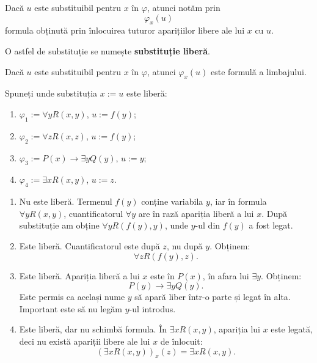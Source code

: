 \begin{definition}
	Dacă \(u\) este substituibil pentru \(x\) în \( \varphi \), atunci notăm prin
	\[
		\varphi_x(u)
	\]
	formula obținută prin înlocuirea tuturor aparițiilor libere ale lui \(x\) cu \(u\).

	O astfel de substituție se numește \textbf{substituție liberă}.
\end{definition}

\begin{prop}
	Dacă \(u\) este substituibil pentru \(x\) în \( \varphi \), atunci \( \varphi_x(u) \) este formulă a limbajului.
\end{prop}

\begin{ex}
	Spuneți unde substituția \(x := u\) este liberă:
	\begin{enumerate}
		\item \( \varphi_1 := \forall y R(x,y) \), \(u := f(y)\);
		\item \( \varphi_2 := \forall z R(x,z) \), \(u := f(y)\);
		\item \( \varphi_3 := P(x) \to \exists y Q(y) \), \(u := y\);
		\item \( \varphi_4 := \exists x R(x,y) \), \(u := z\).
	\end{enumerate}
\end{ex}

\begin{solutie}
	\noindent
	\begin{enumerate}
		\item Nu este liberă. Termenul \(f(y)\) conține variabila \(y\), iar în formula \( \forall y R(x,y) \), cuantificatorul \( \forall y \) are în rază apariția liberă a lui \(x\). După substituție am obține \( \forall y R(f(y),y) \), unde \(y\)-ul din \(f(y)\) a fost legat.

		\item Este liberă. Cuantificatorul este după \(z\), nu după \(y\). Obținem:
		      \[
			      \forall z R(f(y),z).
		      \]

		\item Este liberă. Apariția liberă a lui \(x\) este în \(P(x)\), în afara lui \( \exists y \). Obținem:
		      \[
			      P(y) \to \exists y Q(y).
		      \]
		      Este permis ca același nume \(y\) să apară liber într-o parte și legat în alta. Important este să nu legăm \(y\)-ul introdus.

		\item Este liberă, dar nu schimbă formula. În \( \exists x R(x,y) \), apariția lui \(x\) este legată, deci nu există apariții libere ale lui \(x\) de înlocuit:
		      \[
			      (\exists x R(x,y))_x(z)=\exists x R(x,y).
		      \]
	\end{enumerate}
\end{solutie}

